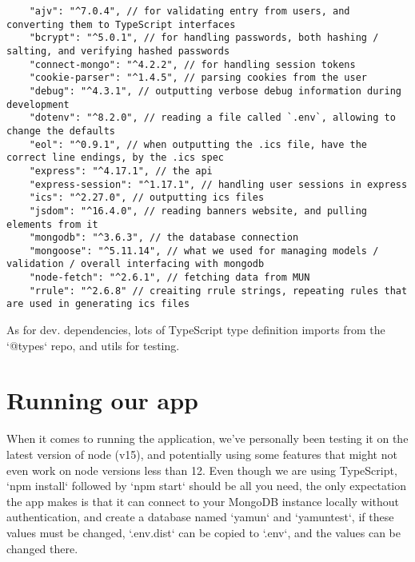 \documentclass[12pt]{article}
\begin{document}
\begin{lstlisting}
    "ajv": "^7.0.4", // for validating entry from users, and converting them to TypeScript interfaces
    "bcrypt": "^5.0.1", // for handling passwords, both hashing / salting, and verifying hashed passwords
    "connect-mongo": "^4.2.2", // for handling session tokens
    "cookie-parser": "^1.4.5", // parsing cookies from the user
    "debug": "^4.3.1", // outputting verbose debug information during development
    "dotenv": "^8.2.0", // reading a file called `.env`, allowing to change the defaults
    "eol": "^0.9.1", // when outputting the .ics file, have the correct line endings, by the .ics spec
    "express": "^4.17.1", // the api
    "express-session": "^1.17.1", // handling user sessions in express
    "ics": "^2.27.0", // outputting ics files
    "jsdom": "^16.4.0", // reading banners website, and pulling elements from it
    "mongodb": "^3.6.3", // the database connection 
    "mongoose": "^5.11.14", // what we used for managing models / validation / overall interfacing with mongodb
    "node-fetch": "^2.6.1", // fetching data from MUN
    "rrule": "^2.6.8" // creaiting rrule strings, repeating rules that are used in generating ics files
\end{lstlisting}

As for dev. dependencies, lots of TypeScript type definition imports from the `@types` repo, and utils for testing.

\section{Running our app}

When it comes to running the application, we've personally been testing it on the latest version of node (v15), and potentially using some features that might not even work on node versions less than 12.  Even though we are using TypeScript, `npm install` followed by `npm start` should be all you need, the only expectation the app makes is that it can connect to your MongoDB instance locally without authentication, and create a database named `yamun` and `yamuntest`, if these values must be changed, `.env.dist` can be copied to `.env`, and the values can be changed there.
\end{document}

